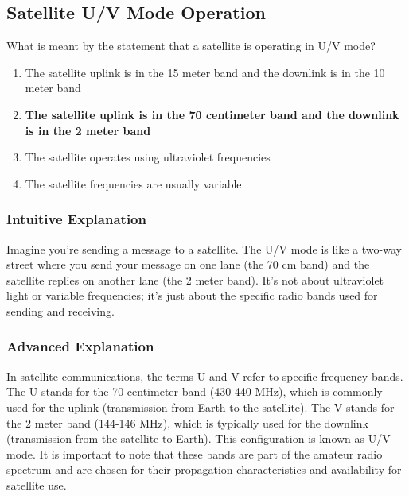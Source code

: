 \subsection{Satellite U/V Mode Operation}
\label{T8B08}

\begin{tcolorbox}[colback=gray!10!white,colframe=black!75!black,title=T8B08]
What is meant by the statement that a satellite is operating in U/V mode?
\begin{enumerate}[noitemsep]
    \item The satellite uplink is in the 15 meter band and the downlink is in the 10 meter band
    \item \textbf{The satellite uplink is in the 70 centimeter band and the downlink is in the 2 meter band}
    \item The satellite operates using ultraviolet frequencies
    \item The satellite frequencies are usually variable
\end{enumerate}
\end{tcolorbox}

\subsubsection*{Intuitive Explanation}
Imagine you're sending a message to a satellite. The U/V mode is like a two-way street where you send your message on one lane (the 70 cm band) and the satellite replies on another lane (the 2 meter band). It's not about ultraviolet light or variable frequencies; it's just about the specific radio bands used for sending and receiving.

\subsubsection*{Advanced Explanation}
In satellite communications, the terms U and V refer to specific frequency bands. The U stands for the 70 centimeter band (430-440 MHz), which is commonly used for the uplink (transmission from Earth to the satellite). The V stands for the 2 meter band (144-146 MHz), which is typically used for the downlink (transmission from the satellite to Earth). This configuration is known as U/V mode. It is important to note that these bands are part of the amateur radio spectrum and are chosen for their propagation characteristics and availability for satellite use.
